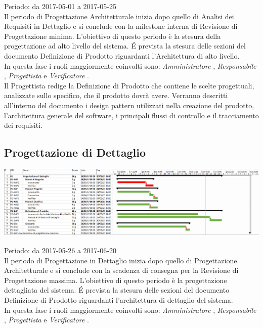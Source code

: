 Periodo: da 2017-05-01 a 2017-05-25 \\
Il periodo di Progettazione Architetturale inizia dopo quello di Analisi dei Requisiti
in Dettaglio e si conclude con la milestone interna di Revisione di Progettazione minima.
L’obiettivo di questo periodo è la stesura della progettazione ad alto livello del sistema.
\'E prevista la stesura delle sezioni del documento Definizione di Prodotto riguardanti l'Architettura di alto livello. \\
In questa fase i ruoli maggiormente coinvolti sono:  \emph{Amministratore} ,  \emph{Responsabile} ,
 \emph{Progettista}  e  \emph{Verificatore} . \\
 Il Progettista redige la Definizione di Prodotto che contiene le scelte
 progettuali, analizzate sullo specifico, che il prodotto dovrà avere. Verranno descritti all’interno del documento i design pattern utilizzati nella creazione del prodotto,
 l’architettura generale del software, i principali flussi di controllo e il tracciamento
 dei requisiti.

\subsection{Progettazione di Dettaglio}

\begin{center}
  \includegraphics[scale=0.2]{img/4-PD.png}
\end{center}

Periodo: da 2017-05-26 a 2017-06-20 \\
Il periodo di Progettazione in Dettaglio inizia dopo quello di Progettazione Architetturale
e si conclude con la scadenza di consegna per la Revisione di Progettazione massima.
L’obiettivo di questo periodo è la progettazione dettagliata del sistema.
\'E prevista la stesura delle sezioni del documento Definizione di Prodotto riguardanti l'architettura di dettaglio del sistema. \\
In questa fase i ruoli maggiormente coinvolti sono:  \emph{Amministratore} ,  \emph{Responsabile} ,
 \emph{Progettista}  e  \emph{Verificatore} .

